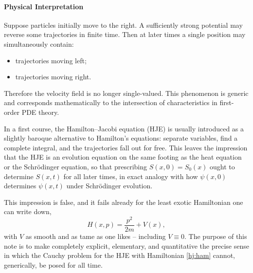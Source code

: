 \paragraph{Physical Interpretation}
Suppose particles initially move to the right. A sufficiently strong potential
may reverse some trajectories in finite time. Then at later times a single
position may simultaneously contain:
\begin{itemize}
\item trajectories moving left;
\item trajectories moving right.
\end{itemize}
Therefore the velocity field is no longer single-valued.
This phenomenon is generic and corresponds mathematically to the intersection
of characteristics in first-order PDE theory.

In a first course, the Hamilton--Jacobi equation (HJE) is usually introduced as
a slightly baroque alternative to Hamilton's equations: separate variables,
find a complete integral, and the trajectories fall out for free. This leaves
the impression that the HJE is an evolution equation on the same footing as the
heat equation or the Schr\"odinger equation, so that prescribing
$S(x,0)=S_0(x)$ ought to determine $S(x,t)$ for all later times, in exact
analogy with how $\psi(x,0)$ determines $\psi(x,t)$ under Schr\"odinger
evolution.

This impression is false, and it fails already for the least exotic Hamiltonian
one can write down,
\begin{equation}
H(x,p) = \frac{p^2}{2m} + V(x),
\label{hj:ham}
\end{equation}
with $V$ as smooth and as tame as one likes -- including $V\equiv 0$. The
purpose of this note is to make completely explicit, elementary, and
quantitative the precise sense in which the Cauchy problem for the HJE with
Hamiltonian \eqref{hj:ham} cannot, generically, be posed for all time.

